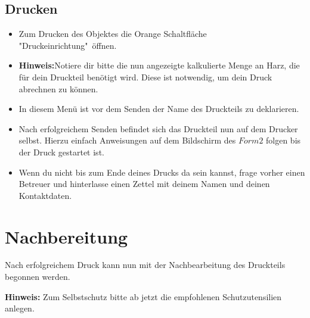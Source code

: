 \documentclass{\basedir/fablab-document}
\begin{document}
\subsection{Drucken}
 \begin{itemize}
 		
		\item Zum Drucken des Objektes die Orange Schaltfläche "Druckeinrichtung"\ öffnen.\\
		\item \textbf{Hinweis:}Notiere dir bitte die nun angezeigte kalkulierte Menge an Harz, die für dein Druckteil benötigt wird. Diese ist notwendig, um dein Druck abrechnen zu können.
		\item In diesem Menü ist vor dem Senden der Name des Druckteils zu deklarieren.\\
		\item Nach erfolgreichem Senden befindet sich das Druckteil nun auf dem Drucker selbst. Hierzu einfach Anweisungen auf dem Bildschirm des $Form2$ folgen bis der Druck gestartet ist.
		\item Wenn du nicht bis zum Ende deines Drucks da sein kannst, frage vorher einen Betreuer und hinterlasse einen Zettel mit deinem Namen und deinen Kontaktdaten.
		
\end{itemize}

	\pagebreak
	
	
\section{Nachbereitung}

Nach erfolgreichem Druck kann nun mit der Nachbearbeitung des Druckteils begonnen werden. 

\textbf{Hinweis:} Zum Selbstschutz bitte ab jetzt die empfohlenen Schutzutensilien anlegen.
\end{document}
